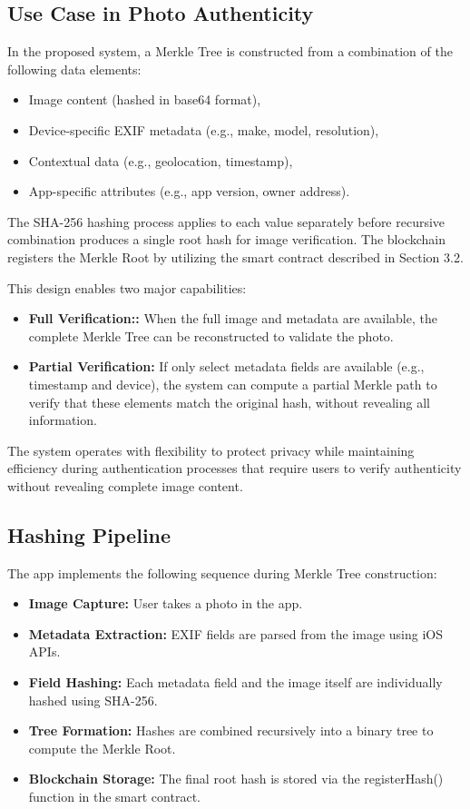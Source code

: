 \subsection{Use Case in Photo Authenticity}
In the proposed system, a Merkle Tree is constructed from a combination of the following data elements:
\begin{itemize}
    \item Image content (hashed in base64 format),
    \item Device-specific EXIF metadata (e.g., make, model, resolution),
    \item Contextual data (e.g., geolocation, timestamp),
    \item App-specific attributes (e.g., app version, owner address).
\end{itemize}

The SHA-256 hashing process applies to each value separately before recursive combination produces a single root hash for image verification. The blockchain registers the Merkle Root by utilizing the smart contract described in Section 3.2.

This design enables two major capabilities:
\begin{itemize}
    \item {\textbf{Full Verification::}} When the full image and metadata are available, the complete Merkle Tree can be reconstructed to validate the photo.
    \item {\textbf{Partial Verification:}} If only select metadata fields are available (e.g., timestamp and device), the system can compute a partial Merkle path to verify that these elements match the original hash, without revealing all information.
\end{itemize}

The system operates with flexibility to protect privacy while maintaining efficiency during authentication processes that require users to verify authenticity without revealing complete image content.

\subsection{Hashing Pipeline}
The app implements the following sequence during Merkle Tree construction:
\begin{itemize}
    \item {\textbf{Image Capture:}} User takes a photo in the app.
    \item {\textbf{Metadata Extraction:}} EXIF fields are parsed from the image using iOS APIs.
    \item {\textbf{Field Hashing:}} Each metadata field and the image itself are individually hashed using SHA-256.
    \item {\textbf{Tree Formation:}} Hashes are combined recursively into a binary tree to compute the Merkle Root.
    \item {\textbf{Blockchain Storage:}} The final root hash is stored via the registerHash() function in the smart contract.
\end{itemize}

